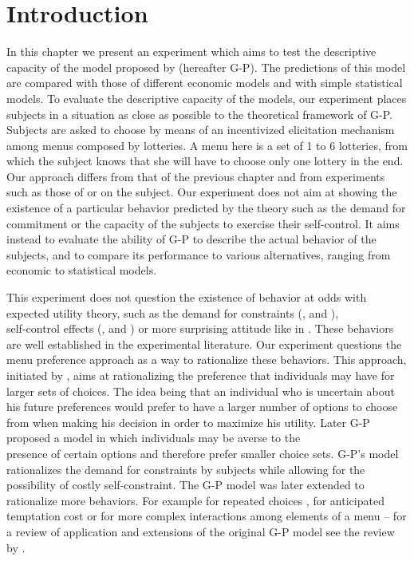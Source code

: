 \documentclass[
]{book}
\begin{document}
\hypertarget{intro3}{%
\section{Introduction}\label{intro3}}

In this chapter we present an experiment which aims to test the descriptive
capacity of the model proposed by \citet{gul2001temptation} (hereafter G-P).
The predictions of this model are compared with those of different economic
models and with simple statistical models.
To evaluate the descriptive capacity of the models, our experiment places
subjects in a situation as close as possible to the theoretical framework of
G-P.
Subjects are asked to choose by means of an incentivized elicitation mechanism
among menus composed by lotteries.
A menu here is a set of 1 to 6 lotteries, from which the subject knows that she will have to
choose only one lottery in the end.
Our approach differs from that of the previous chapter and from experiments such
as those of \citet{houser2018temptation} or \citet{toussaert2018eliciting} on the subject.
Our experiment does not aim at showing the existence of a particular behavior
predicted by the theory such as the demand for commitment or the capacity of the
subjects to exercise their self-control.
It aims instead to evaluate the
ability of G-P to describe the actual behavior of the subjects,
and to compare its performance to various alternatives, ranging from economic to
statistical models.

This experiment does not question the existence of behavior at odds with expected utility theory,
such as the demand for constraints (\citet{chow2011demand}, \citet{gine2010put} and \citet{uhl2011self}),\\
self-control effects (\citet{burger2011field}, \citet{mischel1989delay} and
\citet{kuhn2014self}) or more surprising attitude like in
\citet{dellavigna2006paying}.
These behaviors are well established in the experimental literature.
Our experiment questions the menu preference approach as a way to rationalize
these behaviors.
This approach, initiated by \citet{kreps1979representation}, aims at rationalizing the
preference that individuals may have for larger sets of choices.
The idea being that an individual who is uncertain about his future preferences
would prefer to have a larger number of options to choose from when making his
decision in order to maximize his utility.
Later G-P proposed a model in which individuals may be averse to the\\
presence of certain options and therefore prefer smaller choice sets.
G-P's model rationalizes the demand for constraints by subjects while allowing
for the possibility of costly self-constraint.
The G-P model was later extended to rationalize more behaviors.
For example \citet{gul2004self} for repeated choices , \citet{noor2010uphill} for anticipated
temptation cost or \citet{noor2015menu} for more complex interactions among elements of
a menu -- for a review of application and extensions of the original G-P model see the review by
\citet{lipman2013temptation}.
\end{document}
